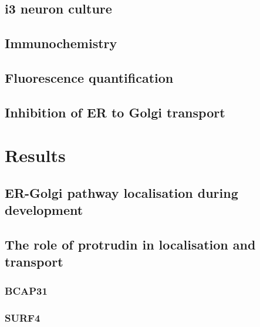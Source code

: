 \documentclass[
  12pt,
  a4paper,
]{book}
\begin{document}
\hypertarget{i3-neuron-culture}{%
\subsection{i3 neuron culture}\label{i3-neuron-culture}}

\hypertarget{immunochemistry}{%
\subsection{Immunochemistry}\label{immunochemistry}}

\hypertarget{fluorescence-quantification}{%
\subsection{Fluorescence quantification}\label{fluorescence-quantification}}

\hypertarget{inhibition-of-er-to-golgi-transport}{%
\subsection{Inhibition of ER to Golgi transport}\label{inhibition-of-er-to-golgi-transport}}

\hypertarget{results-2}{%
\section{Results}\label{results-2}}

\hypertarget{er-golgi-pathway-localisation-during-development}{%
\subsection{ER-Golgi pathway localisation during development}\label{er-golgi-pathway-localisation-during-development}}

\hypertarget{the-role-of-protrudin-in-localisation-and-transport}{%
\subsection{The role of protrudin in localisation and transport}\label{the-role-of-protrudin-in-localisation-and-transport}}

\hypertarget{bcap31}{%
\subsubsection{BCAP31}\label{bcap31}}

\hypertarget{surf4}{%
\subsubsection{SURF4}\label{surf4}}
\end{document}
